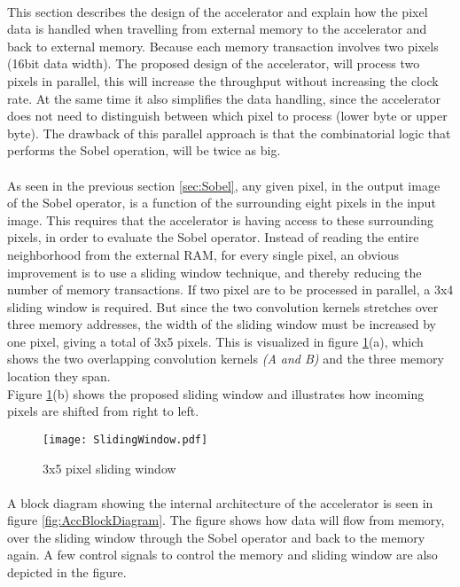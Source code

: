 \paragraph*{}
This section describes the design of the accelerator and explain how the pixel data is handled when travelling from external memory to the accelerator and back to external memory. 
Because each memory transaction involves two pixels (16bit data width). The proposed design of the accelerator, will process two pixels in parallel, this will increase the throughput without increasing the clock rate. At the same time it also simplifies the data handling, since the accelerator does not need to distinguish between which pixel to process (lower byte or upper byte). The drawback of this parallel approach is that the combinatorial logic that performs the Sobel operation, will be twice as big.

\paragraph*{}
As seen in the previous section \ref{sec:Sobel}, any given pixel, in the output image of the Sobel operator, is a function of the surrounding eight pixels in the input image. This requires that the accelerator is having access to these surrounding pixels, in order to evaluate the Sobel operator. Instead of reading the entire neighborhood from the external RAM, for every single pixel, an obvious improvement is to use a sliding window technique, and thereby reducing the number of memory transactions. If two pixel are to be processed in parallel, a 3x4 sliding window is required. But since the two convolution kernels stretches over three memory addresses, the width of the sliding window must be increased by one pixel, giving a total of 3x5 pixels. This is visualized in figure \ref{fig:shift_register}(a), which shows the two overlapping convolution kernels \emph{(A and B)} and the three memory location they span. \\
Figure \ref{fig:shift_register}(b) shows the proposed sliding window and illustrates how incoming pixels are shifted from right to left.

\begin{figure}[H]
	\centering
	\texttt{[image: SlidingWindow.pdf]}
	\caption{3x5 pixel sliding window}
	\label{fig:shift_register}
\end{figure}

\paragraph*{}
A block diagram showing the internal architecture of the accelerator is seen in figure \ref{fig:AccBlockDiagram}. The figure shows how data will flow from memory, over the sliding window through the Sobel operator and back to the memory again. A few control signals to control the memory and sliding window are also depicted in the figure. 

